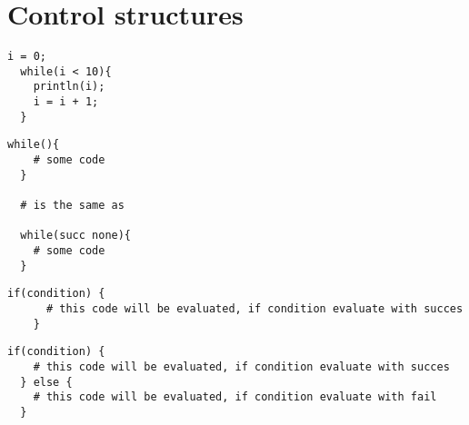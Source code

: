 \chapter{Control structures}

\begin{example}
\begin{lstlisting}[language=intentio]
  i = 0;
  while(i < 10){
    println(i);
    i = i + 1;
  }
\end{lstlisting}
\end{example}

\begin{example}
\begin{lstlisting}[language=intentio]
  while(){
    # some code
  }

  # is the same as

  while(succ none){
    # some code
  }
\end{lstlisting}
\end{example}

\begin{example}[If-condition]
\begin{lstlisting}[language=intentio,mathescape=true]
    if(condition) {
      # this code will be evaluated, if condition evaluate with succes
    }
\end{lstlisting}
\end{example}

\begin{example}
\begin{lstlisting}[language=intentio,mathescape=true]
  if(condition) {
    # this code will be evaluated, if condition evaluate with succes
  } else {
    # this code will be evaluated, if condition evaluate with fail
  }
\end{lstlisting}
\end{example}
